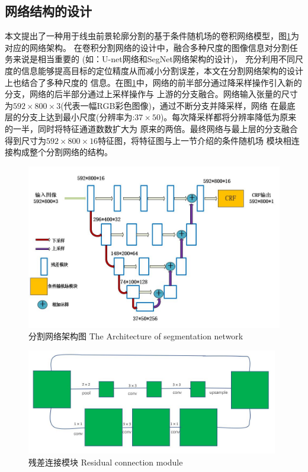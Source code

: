 \subsection{网络结构的设计}
\label{subsec:arch-design}
	本文提出了一种用于线虫前景轮廓分割的基于条件随机场的卷积网络模型，图\ref{fig:chap5:arch}为对应的网络架构。
	在卷积分割网络的设计中，融合多种尺度的图像信息对分割任务来说是相当重要的
	(如：U-net网络\cite{ronneberger2015u}和SegNet网络\cite{badrinarayanan2015segnet}架构的设计)，
	充分利用不同尺度的信息能够提高目标的定位精度从而减小分割误差，本文在分割网络架构的设计上也结合了多种尺度的
	信息。在图\ref{fig:chap5:arch}中，网络的前半部分通过降采样操作引入新的分支，网络的后半部分通过上采样操作与
	上游的分支融合。网络输入张量的尺寸为$592\times800\times3$(代表一幅RGB彩色图像)，通过不断分支并降采样，网络
	在最底层的分支上达到最小尺度(分辨率为:$37\times50$)。每次降采样都将分辨率降低为原来的一半，同时将特征通道数数扩大为
	原来的两倍。最终网络与最上层的分支融合得到尺寸为$592\times800\times16$特征图，将特征图与上一节介绍的条件随机场
	模块相连接构成整个分割网络的结构。
	\begin{figure}[thb]
	  \centering
	  \includegraphics[width=13cm]{figure/chap5/arch.jpg}
	  \bicaption
		{分割网络架构图}
		{The Architecture of segmentation network}
	  \label{fig:chap5:arch}
	\end{figure}
	\begin{figure}[htb]
	  \centering
	  \includegraphics[width=11cm]{figure/chap4/residualpooling.jpg}
	  \bicaption
		{残差连接模块}
		{Residual connection module}
	  \label{fig:chap4:respool}
	\end{figure}
	
